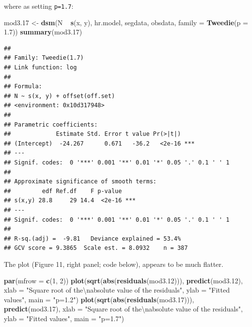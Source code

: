 \documentclass[]{article}
\newenvironment{Shaded}{}{}
\newcommand{\KeywordTok}[1]{\textcolor[rgb]{0.00,0.44,0.13}{\textbf{{#1}}}}
\newcommand{\DataTypeTok}[1]{\textcolor[rgb]{0.56,0.13,0.00}{{#1}}}
\newcommand{\DecValTok}[1]{\textcolor[rgb]{0.25,0.63,0.44}{{#1}}}
\newcommand{\FloatTok}[1]{\textcolor[rgb]{0.25,0.63,0.44}{{#1}}}
\newcommand{\CharTok}[1]{\textcolor[rgb]{0.25,0.44,0.63}{{#1}}}
\newcommand{\StringTok}[1]{\textcolor[rgb]{0.25,0.44,0.63}{{#1}}}
\newcommand{\NormalTok}[1]{{#1}}
\begin{document}
where as setting \texttt{p=1.7}:

\begin{Shaded}
\begin{Highlighting}[]
\NormalTok{mod3}\FloatTok{.17} \NormalTok{<-}\StringTok{ }\KeywordTok{dsm}\NormalTok{(N ~}\StringTok{ }\KeywordTok{s}\NormalTok{(x, y), hr.model, segdata, obsdata, }\DataTypeTok{family =} \KeywordTok{Tweedie}\NormalTok{(}\DataTypeTok{p =} \FloatTok{1.7}\NormalTok{))}
\KeywordTok{summary}\NormalTok{(mod3}\FloatTok{.17}\NormalTok{)}
\end{Highlighting}
\end{Shaded}

\begin{verbatim}
## 
## Family: Tweedie(1.7) 
## Link function: log 
## 
## Formula:
## N ~ s(x, y) + offset(off.set)
## <environment: 0x10d317948>
## 
## Parametric coefficients:
##             Estimate Std. Error t value Pr(>|t|)    
## (Intercept)  -24.267      0.671   -36.2   <2e-16 ***
## ---
## Signif. codes:  0 '***' 0.001 '**' 0.01 '*' 0.05 '.' 0.1 ' ' 1
## 
## Approximate significance of smooth terms:
##         edf Ref.df    F p-value    
## s(x,y) 28.8     29 14.4  <2e-16 ***
## ---
## Signif. codes:  0 '***' 0.001 '**' 0.01 '*' 0.05 '.' 0.1 ' ' 1
## 
## R-sq.(adj) =  -9.81   Deviance explained = 53.4%
## GCV score = 9.3865  Scale est. = 8.0932    n = 387
\end{verbatim}

The plot (Figure 11, right panel; code below), appears to be much
flatter.

\begin{Shaded}
\begin{Highlighting}[]
\KeywordTok{par}\NormalTok{(}\DataTypeTok{mfrow =} \KeywordTok{c}\NormalTok{(}\DecValTok{1}\NormalTok{, }\DecValTok{2}\NormalTok{))}
\KeywordTok{plot}\NormalTok{(}\KeywordTok{sqrt}\NormalTok{(}\KeywordTok{abs}\NormalTok{(}\KeywordTok{residuals}\NormalTok{(mod3}\FloatTok{.12}\NormalTok{))), }\KeywordTok{predict}\NormalTok{(mod3}\FloatTok{.12}\NormalTok{), }\DataTypeTok{xlab =} \StringTok{"Square root of the}\CharTok{\textbackslash{}n}\StringTok{absolute value of the residuals"}\NormalTok{, }
    \DataTypeTok{ylab =} \StringTok{"Fitted values"}\NormalTok{, }\DataTypeTok{main =} \StringTok{"p=1.2"}\NormalTok{)}
\KeywordTok{plot}\NormalTok{(}\KeywordTok{sqrt}\NormalTok{(}\KeywordTok{abs}\NormalTok{(}\KeywordTok{residuals}\NormalTok{(mod3}\FloatTok{.17}\NormalTok{))), }\KeywordTok{predict}\NormalTok{(mod3}\FloatTok{.17}\NormalTok{), }\DataTypeTok{xlab =} \StringTok{"Square root of the}\CharTok{\textbackslash{}n}\StringTok{absolute value of the residuals"}\NormalTok{, }
    \DataTypeTok{ylab =} \StringTok{"Fitted values"}\NormalTok{, }\DataTypeTok{main =} \StringTok{"p=1.7"}\NormalTok{)}
\end{Highlighting}
\end{Shaded}
\end{document}
